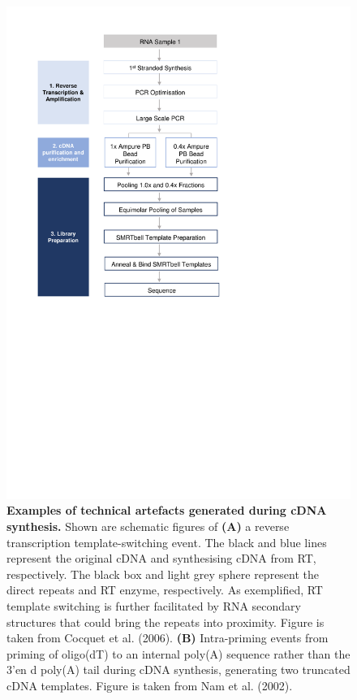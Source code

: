 \begin{figure}[h]
	\begin{center}
		\includegraphics[page=4,trim={2cm 21.5cm 0 1cm},clip, scale = 0.9]{Figures/ProjectDevelopment_Figures.pdf}
	\end{center}
	\captionsetup{width=0.95\textwidth}
	\caption[Examples of technical artefacts generated during cDNA synthesis]%
	{\textbf{Examples of technical artefacts generated during cDNA synthesis.} Shown are schematic figures of \textbf{(A)} a reverse transcription template-switching event. The black and blue lines represent the original cDNA and synthesising cDNA from RT, respectively. The black box and light grey sphere represent the direct repeats and RT enzyme, respectively. As exemplified, RT template switching is further facilitated by RNA secondary structures that could bring the repeats into proximity\cite{Cocquet2006}. Figure is taken from Cocquet et al. (2006)\cite{Cocquet2006}. \textbf{(B)} Intra-priming events from priming of oligo(dT) to an internal poly(A) sequence rather than the 3'en d poly(A) tail during cDNA synthesis, generating two truncated cDNA templates. Figure is taken from Nam et al. (2002)\cite{Nam2002}. }
	\label{fig:lib_prep_artifacts}
\end{figure}

